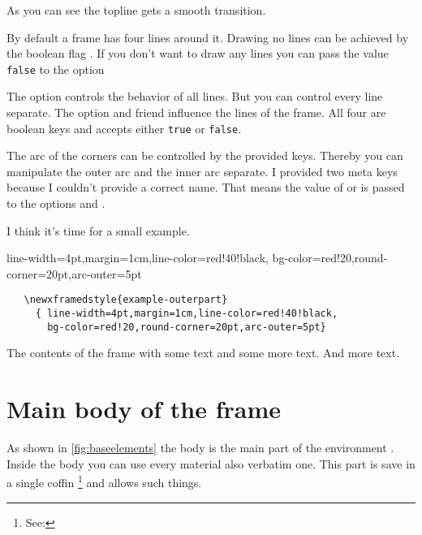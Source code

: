 \documentclass[openany,12pt,tocdepth=3]{ltx-md}
\begin{document}
As you can see the topline gets a smooth transition. 

By default a frame has four lines around it. Drawing no
lines can be achieved by the boolean flag .
If you don't want to draw any lines you can pass the value \texttt{false}
to the option 

The option  controls the behavior
of all lines. But you can control every line separate. The option 
 and friend influence the lines of the frame. All four are 
boolean keys and accepts either \texttt{true} or \texttt{false}.


The arc of the corners can be controlled by the provided keys. Thereby
you can manipulate the outer arc and the inner arc separate.
I provided two meta keys because I couldn't provide a correct name.
That means the value of  or  is passed
to the options  and . 

I think it's time for a small example.

\begin{ltxexample}[caption=Example outer part III,result=true,label=arc]
   { line-width=4pt,margin=1cm,line-color=red!40!black,
     bg-color=red!20,round-corner=20pt,arc-outer=5pt}
\begin{xframed}[style=example-outerpart]
 \begin{verbatim}
   \newxframedstyle{example-outerpart}
     { line-width=4pt,margin=1cm,line-color=red!40!black,
       bg-color=red!20,round-corner=20pt,arc-outer=5pt}
 \end{verbatim}
 The contents of the frame with some text
 and some more text. And more text.
\end{xframed}
\end{ltxexample}

\section{Main body of the frame}\label{sec:element-main}
As shown in \autoref{fig:baseelements} the body is the main part of
the environment . Inside the body you can use every
material also verbatim one. This part is save in a single coffin%
\footnote{See: }  and allows such things. 
\end{document}
